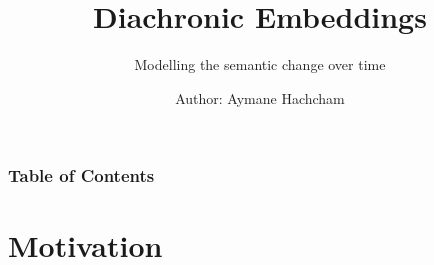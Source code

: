 \documentclass[
    11pt, %
    aspectratio=169, %
]{beamer}
\title[Middle Footer]{Diachronic Embeddings}
\subtitle{Modelling the semantic change over time}
\author[Left Footer]{Author: Aymane Hachcham}
\institute[]{Department of Statistics \\}
\date[WiSE 2022/23]
\begin{document}
\section{}
\begin{frame}
	\titlepage %
 
\end{frame}


\begin{frame}
	\frametitle{Table of Contents} %
	
	\tableofcontents %
\end{frame}

\section{Motivation} %
\end{document}

